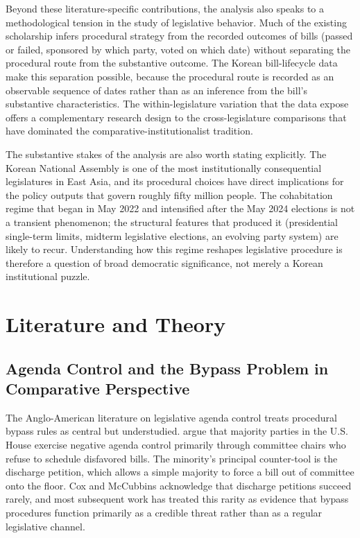 \documentclass[11pt]{article}
\begin{document}
Beyond these literature-specific contributions, the analysis also speaks to a methodological tension in the study of legislative behavior. Much of the existing scholarship infers procedural strategy from the recorded outcomes of bills (passed or failed, sponsored by which party, voted on which date) without separating the procedural route from the substantive outcome. The Korean bill-lifecycle data make this separation possible, because the procedural route is recorded as an observable sequence of dates rather than as an inference from the bill's substantive characteristics. The within-legislature variation that the data expose offers a complementary research design to the cross-legislature comparisons that have dominated the comparative-institutionalist tradition.

The substantive stakes of the analysis are also worth stating explicitly. The Korean National Assembly is one of the most institutionally consequential legislatures in East Asia, and its procedural choices have direct implications for the policy outputs that govern roughly fifty million people. The cohabitation regime that began in May 2022 and intensified after the May 2024 elections is not a transient phenomenon; the structural features that produced it (presidential single-term limits, midterm legislative elections, an evolving party system) are likely to recur. Understanding how this regime reshapes legislative procedure is therefore a question of broad democratic significance, not merely a Korean institutional puzzle.

\section{Literature and Theory}

\subsection{Agenda Control and the Bypass Problem in Comparative Perspective}

The Anglo-American literature on legislative agenda control treats procedural bypass rules as central but understudied. \citet{coxmccubbins2005} argue that majority parties in the U.S. House exercise negative agenda control primarily through committee chairs who refuse to schedule disfavored bills. The minority's principal counter-tool is the discharge petition, which allows a simple majority to force a bill out of committee onto the floor. Cox and McCubbins acknowledge that discharge petitions succeed rarely, and most subsequent work has treated this rarity as evidence that bypass procedures function primarily as a credible threat rather than as a regular legislative channel.
\end{document}
